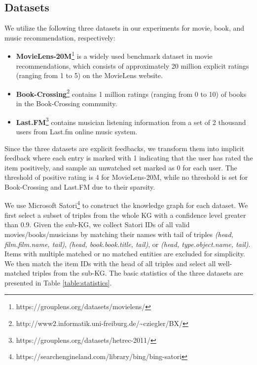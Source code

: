 \documentclass[sigconf]{acmart}
\begin{document}
	\subsection{Datasets}
		We utilize the following three datasets in our experiments for movie, book, and music recommendation, respectively:
		\begin{itemize}
			\item
				\textbf{MovieLens-20M}\footnote{https://grouplens.org/datasets/movielens/} is a widely used benchmark dataset in movie recommendations, which consists of approximately 20 million explicit ratings (ranging from 1 to 5) on the MovieLens website.
			\item
				\textbf{Book-Crossing}\footnote{http://www2.informatik.uni-freiburg.de/\textasciitilde cziegler/BX/} contains 1 million ratings (ranging from 0 to 10) of books in the Book-Crossing community.
			\item
				\textbf{Last.FM}\footnote{https://grouplens.org/datasets/hetrec-2011/} contains musician listening information from a set of 2 thousand users from Last.fm online music system.
		\end{itemize}
		
		Since the three datasets are explicit feedbacks, we transform them into implicit feedback where each entry is marked with 1 indicating that the user has rated the item positively, and sample an unwatched set marked as 0 for each user.
		The threshold of positive rating is 4 for MovieLens-20M, while no threshold is set for Book-Crossing and Last.FM due to their sparsity.
		
		We use Microsoft Satori\footnote{https://searchengineland.com/library/bing/bing-satori} to construct the knowledge graph for each dataset.
		We first select a subset of triples from the whole KG with a confidence level greater than 0.9.
		Given the sub-KG, we collect Satori IDs of all valid movies/books/musicians by matching their names with tail of triples \textit{(head, film.film.name, tail)}, \textit{(head, book.book.title, tail)}, or \textit{(head, type.object.name, tail)}.
		Items with multiple matched or no matched entities are excluded for simplicity.
		We then match the item IDs with the head of all triples and select all well-matched triples from the sub-KG.
		The basic statistics of the three datasets are presented in Table \ref{table:statistics}.
		
\end{document}
